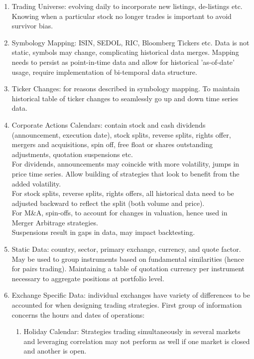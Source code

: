 \documentclass[a4paper,oneside,openany]{book}
\begin{document}
\begin{definition} 
\begin{enumerate}[label=\roman*.]
\setlength{\itemsep}{0pt}
\item Trading Universe: evolving daily to incorporate new listings, de-listings etc. Knowing when a particular stock no longer trades is important to avoid survivor bias.
\item Symbology Mapping: ISIN, SEDOL, RIC, Bloomberg Tickers etc. Data is not static, symbols may change, complicating historical data merges. Mapping needs to persist as point-in-time data and allow for historical 'as-of-date' usage, require implementation of bi-temporal data structure. 
\item Ticker Changes: for reasons described in symbology mapping. To maintain historical table of ticker changes to seamlessly go up and down time series data.
\item Corporate Actions Calendars: contain stock and cash dividends (announcement, execution date), stock splits, reverse splits, rights offer, mergers and acquisitions, spin off, free float or shares outstanding adjustments, quotation suspensions etc.\\
For dividends, announcements may coincide with more volatility, jumps in price time series. Allow building of strategies that look to benefit from the added volatility.\\
For stock splits, reverse splits, rights offers, all historical data need to be adjusted backward to reflect the split (both volume and price).\\
For M\&A, spin-offs, to account for changes in valuation, hence used in Merger Arbitrage strategies.\\
Suspensions result in gaps in data, may impact backtesting.
\item Static Data: country, sector, primary exchange, currency, and quote factor. May be used to group instruments based on fundamental similarities (hence for pairs trading). Maintaining a table of quotation currency per instrument necessary to aggregate positions at portfolio level.
\item Exchange Specific Data: individual exchanges have variety of differences to be accounted for when designing trading strategies. First group of information concerns the hours and dates of operations:
\begin{enumerate}[label=\arabic*.]
\setlength{\itemsep}{0pt}
\item Holiday Calendar: Strategies trading simultaneously in several markets and leveraging correlation may not perform as well if one market is closed and another is open.

\end{enumerate}
\end{enumerate}
\end{definition}
\end{document}
